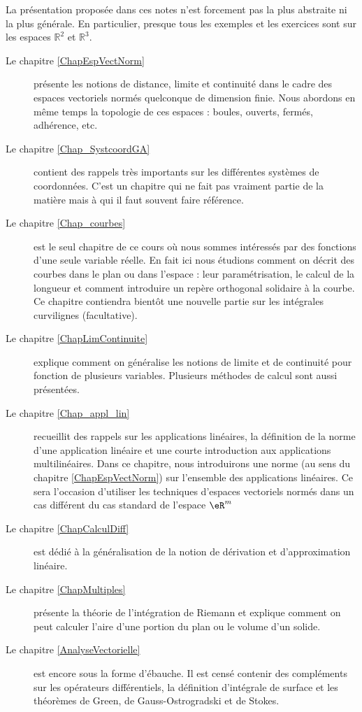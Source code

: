 La présentation proposée dans ces notes n'est forcement pas la plus abstraite ni la plus générale. En particulier, presque tous les exemples et les exercices sont sur les espaces $\mathbb{R}^2$ et $\mathbb{R}^3$.
 
\begin{description}
	\item[Le chapitre  \ref{ChapEspVectNorm}] présente les notions de distance, limite et continuité dans le cadre des espaces vectoriels normés quelconque de dimension finie. Nous abordons en même temps la topologie de ces espaces : boules, ouverts, fermés, adhérence, etc.
        \item[Le chapitre  \ref{Chap_SystcoordGA}] contient des rappels très importants sur les différentes systèmes de coordonnées. C'est un chapitre qui ne fait pas vraiment partie de la matière mais à qui il faut souvent faire référence.    
	\item[Le chapitre \ref{Chap_courbes}] est le seul chapitre de ce cours où nous sommes intéressés par des fonctions d'une seule variable réelle. En fait ici  nous étudions comment on décrit des courbes dans le plan ou dans l'espace : leur paramétrisation, le calcul de la longueur et comment introduire un repère orthogonal solidaire à la courbe. Ce chapitre contiendra bientôt une nouvelle partie sur les intégrales curvilignes (facultative).
	\item[Le chapitre \ref{ChapLimContinuite}] explique comment on généralise les notions de limite et de continuité pour fonction de plusieurs variables. Plusieurs méthodes de calcul sont aussi présentées. 
	\item[Le chapitre \ref{Chap_appl_lin}] recueillit des rappels sur les applications linéaires, la définition de la norme d'une application linéaire et une courte introduction aux applications multilinéaires. Dans ce chapitre, nous introduirons une norme (au sens du chapitre \ref{ChapEspVectNorm}) sur l'ensemble des applications linéaires. Ce sera l'occasion d'utiliser les techniques d'espaces vectoriels normés dans un cas différent du cas standard de l'espace $\eR^m$
	\item[Le chapitre \ref{ChapCalculDiff}] est dédié à la généralisation de la notion de dérivation et d'approximation linéaire.
	\item[Le chapitre \ref{ChapMultiples}] présente la théorie de l'intégration de Riemann et explique comment on peut calculer l'aire d'une portion du plan ou le volume d'un solide. 
        \item[Le chapitre \ref{AnalyseVectorielle}] est encore sous la forme d'ébauche. Il est censé contenir des compléments sur les opérateurs différentiels, la définition d'intégrale de surface et les théorèmes de Green, de Gauss-Ostrogradski et de Stokes.   


\end{description}
